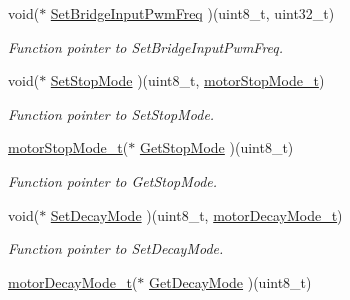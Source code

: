 \begin{DoxyCompactItemize}
\mbox{\label{structmotor_drv__t_adb59734f8e6cd4398f1642f61f694efe}} 
void($\ast$ \mbox{\hyperlink{structmotor_drv__t_adb59734f8e6cd4398f1642f61f694efe}{Set\+Bridge\+Input\+Pwm\+Freq}} )(uint8\+\_\+t, uint32\+\_\+t)
\begin{DoxyCompactList}\small\item\em Function pointer to Set\+Bridge\+Input\+Pwm\+Freq. \end{DoxyCompactList}\item 
\mbox{\label{structmotor_drv__t_a9caf85723b22c4f70324374d7583ac55}} 
void($\ast$ \mbox{\hyperlink{structmotor_drv__t_a9caf85723b22c4f70324374d7583ac55}{Set\+Stop\+Mode}} )(uint8\+\_\+t, \mbox{\hyperlink{group___stop__mode_ga48c6e38e969d0dbffe3d66b58df2c7d8}{motor\+Stop\+Mode\+\_\+t}})
\begin{DoxyCompactList}\small\item\em Function pointer to Set\+Stop\+Mode. \end{DoxyCompactList}\item 
\mbox{\label{structmotor_drv__t_a34e9b7daeeda0e11595e221845c77486}} 
\mbox{\hyperlink{group___stop__mode_ga48c6e38e969d0dbffe3d66b58df2c7d8}{motor\+Stop\+Mode\+\_\+t}}($\ast$ \mbox{\hyperlink{structmotor_drv__t_a34e9b7daeeda0e11595e221845c77486}{Get\+Stop\+Mode}} )(uint8\+\_\+t)
\begin{DoxyCompactList}\small\item\em Function pointer to Get\+Stop\+Mode. \end{DoxyCompactList}\item 
\mbox{\label{structmotor_drv__t_a7377b03dbe90fff1295a3ad887b21e76}} 
void($\ast$ \mbox{\hyperlink{structmotor_drv__t_a7377b03dbe90fff1295a3ad887b21e76}{Set\+Decay\+Mode}} )(uint8\+\_\+t, \mbox{\hyperlink{group___decay__mode_ga43befb62c97ff88c1405f468c49f8334}{motor\+Decay\+Mode\+\_\+t}})
\begin{DoxyCompactList}\small\item\em Function pointer to Set\+Decay\+Mode. \end{DoxyCompactList}\item 
\mbox{\label{structmotor_drv__t_a4376c42eb20e05e0c5c1851dd6646210}} 
\mbox{\hyperlink{group___decay__mode_ga43befb62c97ff88c1405f468c49f8334}{motor\+Decay\+Mode\+\_\+t}}($\ast$ \mbox{\hyperlink{structmotor_drv__t_a4376c42eb20e05e0c5c1851dd6646210}{Get\+Decay\+Mode}} )(uint8\+\_\+t)

\end{DoxyCompactItemize}
